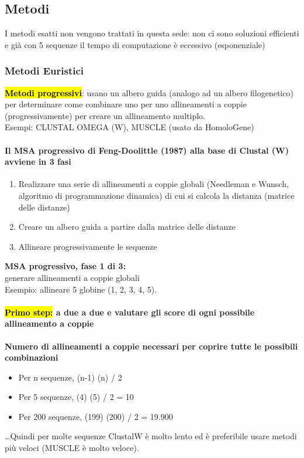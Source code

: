 \documentclass{article}
\begin{document}
\subsection{Metodi}
I metodi esatti non vengono trattati in questa sede: non ci sono soluzioni efficienti e già con 5 sequenze il tempo di computazione è eccessivo (esponenziale)
\subsubsection{Metodi Euristici}
\hl{\textbf{Metodi progressivi}}: usano un albero guida (analogo ad un albero filogenetico) per determinare come combinare uno per uno allineamenti a coppie
(progressivamente) per creare un allineamento multiplo.\\
\small{Esempi: CLUSTAL OMEGA (W), MUSCLE (usato da HomoloGene)}
\paragraph{Il MSA progressivo di Feng-Doolittle (1987) alla base di Clustal (W) avviene in 3 fasi}
\begin{enumerate}
    \item Realizzare una serie di allineamenti a coppie globali (Needleman e Wunsch, algoritmo di programmazione dinamica) di cui si calcola la distanza (matrice delle distanze)
    \item Creare un albero guida a partire dalla matrice delle distanze
    \item Allineare progressivamente le sequenze
\end{enumerate}
\textbf{MSA progressivo, fase 1 di 3:}\\
\normalsize{generare allineamenti a coppie globali}\\
\small{Esempio: allineare 5 globine (1, 2, 3, 4, 5).}\\
\paragraph{\hl{Primo step:} a due a due e valutare gli score di ogni possibile allineamento a coppie\\}
\textbf{Numero di allineamenti a coppie necessari per coprire tutte le possibili combinazioni}
\begin{itemize}
    \item Per n sequenze, (n-1) (n) / 2
    \item Per 5 sequenze, (4) (5) / 2 = 10
    \item Per 200 sequenze, (199) (200) / 2 = 19.900
\end{itemize}…Quindi per molte sequenze ClustalW è molto lento ed è preferibile usare metodi più veloci (MUSCLE è molto veloce).
\end{document}
